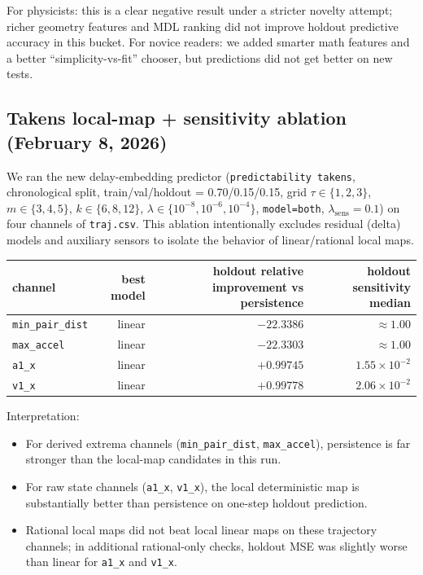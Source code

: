 \documentclass[11pt]{article}
\begin{document}
For physicists: this is a clear negative result under a stricter novelty attempt; richer geometry features and MDL ranking did not improve holdout predictive accuracy in this bucket.
For novice readers: we added smarter math features and a better ``simplicity-vs-fit'' chooser, but predictions did not get better on new tests.

\subsection{Takens local-map + sensitivity ablation (February 8, 2026)}
We ran the new delay-embedding predictor (\texttt{predictability takens}, chronological split, train/val/holdout = 0.70/0.15/0.15, grid $\tau\in\{1,2,3\}$, $m\in\{3,4,5\}$, $k\in\{6,8,12\}$, $\lambda\in\{10^{-8},10^{-6},10^{-4}\}$, \texttt{model=both}, $\lambda_{\mathrm{sens}}=0.1$) on four channels of \texttt{traj.csv}.
This ablation intentionally excludes residual (delta) models and auxiliary sensors to isolate the behavior of linear/rational local maps.

\begin{center}
\begin{tabular}{lrrr}
\hline
channel & best model & holdout relative improvement vs persistence & holdout sensitivity median \\
\hline
\texttt{min\_pair\_dist} & linear & $-22.3386$ & $\approx 1.00$ \\
\texttt{max\_accel} & linear & $-22.3303$ & $\approx 1.00$ \\
\texttt{a1\_x} & linear & $+0.99745$ & $1.55\times10^{-2}$ \\
\texttt{v1\_x} & linear & $+0.99778$ & $2.06\times10^{-2}$ \\
\hline
\end{tabular}
\end{center}

Interpretation:
\begin{itemize}
\item For derived extrema channels (\texttt{min\_pair\_dist}, \texttt{max\_accel}), persistence is far stronger than the local-map candidates in this run.
\item For raw state channels (\texttt{a1\_x}, \texttt{v1\_x}), the local deterministic map is substantially better than persistence on one-step holdout prediction.
\item Rational local maps did not beat local linear maps on these trajectory channels; in additional rational-only checks, holdout MSE was slightly worse than linear for \texttt{a1\_x} and \texttt{v1\_x}.
\end{itemize}
\end{document}
